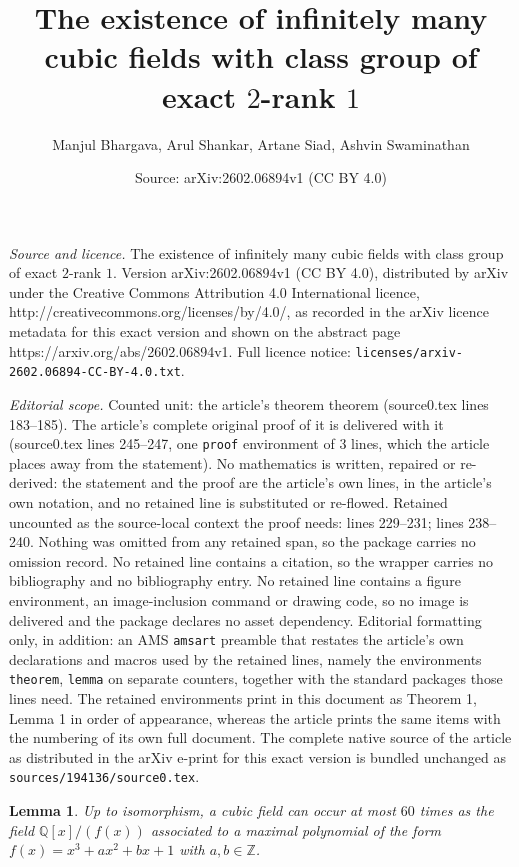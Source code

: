 \documentclass[10pt,a4paper]{amsart}
\title{The existence of infinitely many cubic fields with class group of exact $2$-rank $1$}
\author{Manjul Bhargava, Arul Shankar, Artane Siad, Ashvin Swaminathan}
\date{Source: arXiv:2602.06894v1 (CC BY 4.0)}
\newtheorem{lemma}{Lemma}
\begin{document}
\maketitle

\noindent\emph{Source and licence.} The existence of infinitely many cubic fields with class group of exact $2$-rank $1$. Version arXiv:2602.06894v1 (CC BY 4.0), distributed by arXiv under the Creative Commons Attribution 4.0 International licence, http://creativecommons.org/licenses/by/4.0/, as recorded in the arXiv licence metadata for this exact version and shown on the abstract page https://arxiv.org/abs/2602.06894v1. Full licence notice: \texttt{licenses/arxiv-2602.06894-CC-BY-4.0.txt}.\par\smallskip

\noindent\textit{Editorial scope.} Counted unit: the article's theorem theorem (source0.tex lines 183--185). The article's complete original proof of it is delivered with it (source0.tex lines 245--247, one \texttt{proof} environment of 3 lines, which the article places away from the statement). No mathematics is written, repaired or re-derived: the statement and the proof are the article's own lines, in the article's own notation, and no retained line is substituted or re-flowed.  Retained uncounted as the source-local context the proof needs: lines 229--231; lines 238--240.  Nothing was omitted from any retained span, so the package carries no omission record.  No retained line contains a citation, so the wrapper carries no bibliography and no bibliography entry.  No retained line contains a figure environment, an image-inclusion command or drawing code, so no image is delivered and the package declares no asset dependency.  Editorial formatting only, in addition: an AMS \texttt{amsart} preamble that restates the article's own declarations and macros used by the retained lines, namely the environments \texttt{theorem}, \texttt{lemma} on separate counters, together with the standard packages those lines need.  The retained environments print in this document as Theorem 1, Lemma 1 in order of appearance, whereas the article prints the same items with the numbering of its own full document.  The complete native source of the article as distributed in the arXiv e-print for this exact version is bundled unchanged as \texttt{sources/194136/source0.tex}.
\begin{lemma} \label{lem: finite repetition}
    Up to isomorphism, a cubic field can occur at most $60$ times as the field $\mathbb{Q}[x]/(f(x))$ associated to a maximal polynomial of the form $f(x) = x^3+ax^2+bx+1$ with $a,b \in \mathbb{Z}$. 
\end{lemma}
\end{document}
